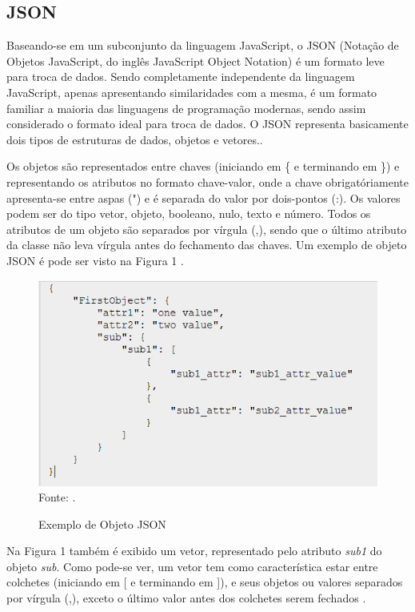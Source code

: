 \subsection{JSON}
Baseando-se em um subconjunto da linguagem JavaScript, o JSON (Notação de Objetos JavaScript, do inglês JavaScript Object Notation) é um formato leve para troca de dados. Sendo completamente independente da linguagem JavaScript, apenas apresentando similaridades com a mesma, é um formato familiar a maioria das linguagens de programação modernas, sendo assim considerado o formato ideal para troca de dados. O JSON representa basicamente dois tipos de estruturas de dados, objetos e vetores.\cite{JSON}.

Os objetos são representados entre chaves (iniciando em \{ e terminando em \}) e representando os atributos no formato chave-valor, onde a chave obrigatóriamente apresenta-se entre aspas (") e é separada do valor por dois-pontos (:). Os valores podem ser do tipo vetor, objeto, booleano, nulo, texto e número. Todos os atributos de um objeto são separados por vírgula (,), sendo que o último atributo da classe não leva vírgula antes do fechamento das chaves. Um exemplo de objeto JSON é pode ser visto na Figura 1 \cite{JSON}.

\begin{figure}[!htb]
     \centering
     \caption{Exemplo de Objeto JSON}
     \includegraphics[scale=1]{imagens/exemplojson.png}
     \\ Fonte: \cite{JSONLint}.
\end{figure}

Na Figura 1 também é exibido um vetor, representado pelo atributo \emph{sub1} do objeto \emph{sub}. Como pode-se ver, um vetor tem como característica estar entre colchetes (iniciando em [ e terminando em ]), e seus objetos ou valores separados por vírgula (,), exceto o último valor antes dos colchetes serem fechados \cite{JSON}.

